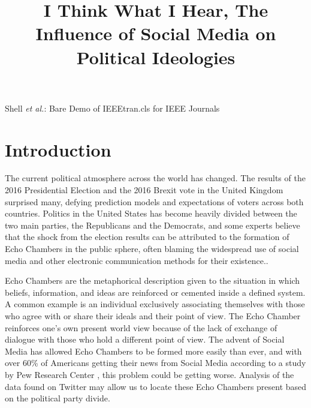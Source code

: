 \documentclass[journal]{IEEEtran}
\begin{document}
\title{I Think What I Hear, The Influence of Social Media on Political Ideologies}


\author{
}

%
{Shell \MakeLowercase{\textit{et al.}}: Bare Demo of IEEEtran.cls for IEEE Journals}


\maketitle



%
\IEEEpeerreviewmaketitle



	\section{Introduction}

	The current political atmosphere across the world has changed. The results of the 2016 Presidential Election and the 2016 Brexit vote in the United Kingdom surprised many, defying prediction models and expectations of voters across both countries. Politics in the United States has become heavily divided between the two main parties, the Republicans and the Democrats, and some experts believe that the shock from the election results can be attributed to the formation of Echo Chambers in the public sphere, often blaming the widespread use of social media and other electronic communication methods for their existence.\cite{npr}\cite{cnn}\cite{nyt}.
	
	Echo Chambers are the metaphorical description given to the situation in which beliefs, information, and ideas are reinforced or cemented inside a defined system. A common example is an individual exclusively associating themselves with those who agree with or share their ideals and their point of view. The Echo Chamber reinforces one’s own present world view because of the lack of exchange of dialogue with those who hold a different point of view. The advent of Social Media has allowed Echo Chambers to be formed more easily than ever, and with over 60\% of Americans getting their news from Social Media according to a study by Pew Research Center \cite{pew}, this problem could be getting worse. Analysis of the data found on Twitter may allow us to locate these Echo Chambers present based on the political party divide.
	
\end{document}
